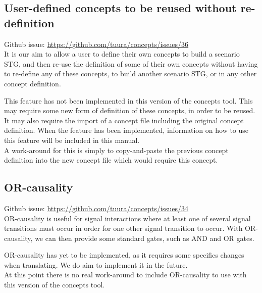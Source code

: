 \documentclass{proc}
\begin{document}
\subsection*{User-defined concepts to be reused without re-definition}

Github issue: \url{https://github.com/tuura/concepts/issues/36}\\

It is our aim to allow a user to define their own concepts to build a scenario STG, and then re-use the definition of some of their own concepts without having to re-define any of 
these concepts, to build another scenario STG, or in any other concept definition. 

This feature has not been implemented in this version of the concepts tool. This may require some new form of definition of these concepts, in order to be reused. It may also require the 
import of a concept file including the original concept definition. When the feature has been implemented, information on how to use this feature will be included in this manual.  \\

A work-around for this is simply to copy-and-paste the previous concept definition into the new concept file which would require this concept. 

\subsection*{OR-causality}

Github issue: \url{https://github.com/tuura/concepts/issues/34}\\

OR-causality is useful for signal interactions where at least one of several signal transitions must occur in order for one other signal transition to occur.  
With OR-causality, we can then provide some standard gates, such as AND and OR gates. 

OR-causality has yet to be implemented, as it requires some specifics changes when translating. We do aim to implement it in the future. \\

At this point there is no real work-around to include OR-causality to use with this version of the concepts tool.



\end{document}
